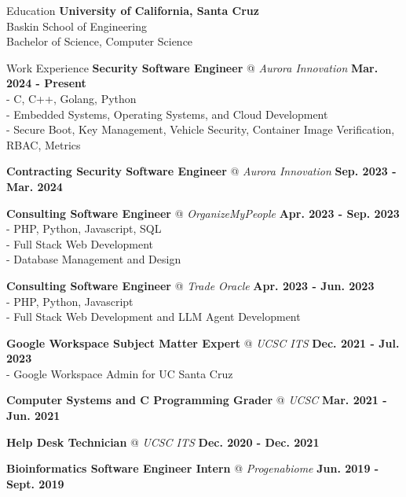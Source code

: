 \documentclass{resume} %
\begin{document}
\begin{rSection}{Education}
    \textbf{University of California, Santa Cruz}
    \\ Baskin School of Engineering
    \\ Bachelor of Science, Computer Science
\end{rSection}

\begin{rSection}{Work Experience}
    {\textbf{Security Software Engineer}} @ \textit{{Aurora Innovation}}
    \hfill{\textbf {Mar. 2024 - Present}}
    \\ - C, C++, Golang, Python
    \\ - Embedded Systems, Operating Systems, and Cloud Development
    \\ - Secure Boot, Key Management, Vehicle Security, Container Image Verification, RBAC, Metrics

    {\textbf{Contracting Security Software Engineer}} @ \textit{{Aurora Innovation}}
    \hfill{\textbf {Sep. 2023 - Mar. 2024}}

    {\textbf{Consulting Software Engineer} @ \textit{OrganizeMyPeople}}
    \hfill{\textbf {Apr. 2023 - Sep. 2023}}
    \\ - PHP, Python, Javascript, SQL
    \\ - Full Stack Web Development
    \\ - Database Management and Design


    \textbf{Consulting Software Engineer} @  \textit{Trade Oracle}
    \hfill{\textbf {Apr. 2023 - Jun. 2023}}
    \\ - PHP, Python, Javascript
    \\ - Full Stack Web Development and LLM Agent Development

    {\textbf{Google Workspace Subject Matter Expert} @ \textit{UCSC ITS} }
    \hfill{\textbf {Dec. 2021 - Jul. 2023}}
    \\ - Google Workspace Admin for UC Santa Cruz

    {\textbf{Computer Systems and C Programming Grader} @ \textit{UCSC} }
    \hfill{\textbf {Mar. 2021 - Jun. 2021}}

    {\textbf{Help Desk Technician} @ \textit{UCSC ITS}}
    \hfill{\textbf {Dec. 2020 - Dec. 2021}}

    {\textbf{Bioinformatics Software Engineer Intern} @ \textit{Progenabiome}}
    \hfill{\textbf {Jun. 2019 - Sept. 2019}}
\end{rSection}
\end{document}
